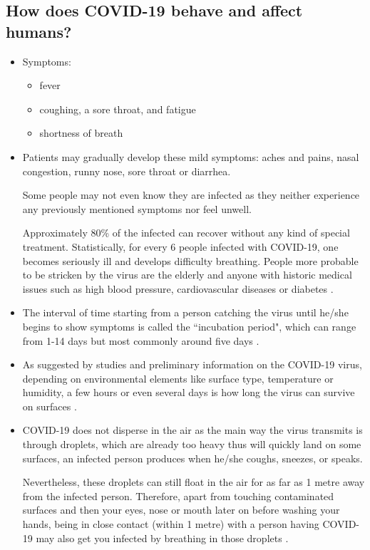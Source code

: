   \subsection{How does COVID-19 behave and affect humans?}
    \begin{itemize}
      \item Symptoms: \parencite{HealthGovAU}
        \begin{itemize}
          \item fever
          \item coughing, a sore throat, and fatigue
          \item shortness of breath
        \end{itemize}
      \item Patients may gradually develop these mild symptoms: aches and pains, nasal congestion, runny nose, sore throat or diarrhea.
      \par Some people may not even know they are infected as they neither experience any previously mentioned symptoms nor feel unwell.
      \par Approximately 80\% of the infected can recover without any kind of special treatment. Statistically, for every 6 people infected with COVID-19, one becomes seriously ill and develops difficulty breathing. People more probable to be stricken by the virus are the elderly and anyone with historic medical issues such as high blood pressure, cardiovascular diseases or diabetes \parencite{Q&A_WHO}.
      \item The interval of time starting from a person catching the virus until he/she begins to show symptoms is called the ``incubation period", which can range from 1-14 days but most commonly around five days \parencite{Q&A_WHO}.
      \item As suggested by studies and preliminary information on the COVID-19 virus, depending on environmental elements like surface type, temperature or humidity, a few hours or even several days is how long the virus can survive on surfaces \parencite{Q&A_WHO}.
      \item COVID-19 does not disperse in the air as the main way the virus transmits is through droplets, which are already too heavy thus will quickly land on some surfaces, an infected person produces when he/she coughs, sneezes, or speaks.
      \par Nevertheless, these droplets can still float in the air for as far as 1 metre away from the infected person. Therefore, apart from touching contaminated surfaces and then your eyes, nose or mouth later on before washing your hands, being in close contact (within 1 metre) with a person having COVID-19 may also get you infected by breathing in those droplets \parencite{Q&A_WHO}.

\end{itemize}
